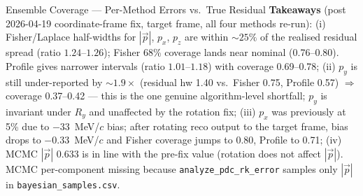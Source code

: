 \documentclass[aspectratio=169]{beamer}
\begin{document}
\begin{frame}{Ensemble Coverage --- Per-Method Errors vs.\ True Residual}
\textbf{Takeaways} (post 2026-04-19 coordinate-frame fix, target frame, all four methods re-run): (i) Fisher/Laplace half-widths for $|\vec{p}|$, $p_x$, $p_z$ are within $\sim\!25\%$ of the realised residual spread (ratio $1.24$--$1.26$); Fisher 68\% coverage lands near nominal (0.76--0.80). Profile gives narrower intervals (ratio $1.01$--$1.18$) with coverage 0.69--0.78; (ii) $p_y$ is still under-reported by $\sim\!1.9\times$ (residual hw 1.40 vs.\ Fisher 0.75, Profile 0.57) $\Rightarrow$ coverage 0.37--0.42 --- this is the one genuine algorithm-level shortfall; $p_y$ is invariant under $R_y$ and unaffected by the rotation fix; (iii) $p_x$ was previously at 5\% due to $-33$~MeV/$c$ bias; after rotating reco output to the target frame, bias drops to $-0.33$~MeV/$c$ and Fisher coverage jumps to 0.80, Profile to 0.71; (iv) MCMC $|\vec p|$ 0.633 is in line with the pre-fix value (rotation does not affect $|\vec p|$). MCMC per-component missing because \texttt{analyze\_pdc\_rk\_error} samples only $|\vec p|$ in \texttt{bayesian\_samples.csv}.
\end{frame}
\end{document}
